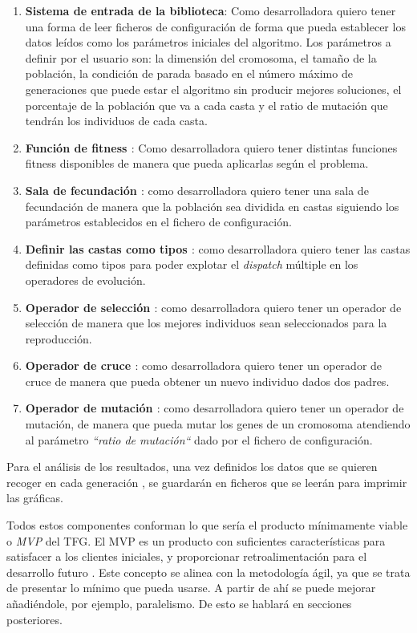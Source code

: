 \begin{enumerate}
    \item \textbf{Sistema de entrada de la biblioteca}: Como desarrolladora quiero tener una forma de leer ficheros de configuración de forma que pueda
    establecer los datos leídos como los parámetros iniciales del algoritmo. Los parámetros a definir por el usuario son: la dimensión del cromosoma, el tamaño de la población, 
    la condición de parada basado en el número máximo de generaciones que puede estar el algoritmo sin producir mejores soluciones, el porcentaje de la población que va a cada casta y 
    el ratio de mutación que tendrán los individuos de cada casta.
    \item \textbf{Función de fitness \cite{project_repository_8}}: Como desarrolladora quiero tener distintas funciones fitness disponibles de manera que pueda aplicarlas según 
    el problema.
    \item \textbf{Sala de fecundación \cite{project_repository_17}}: como desarrolladora quiero tener una sala de fecundación de manera que la población sea dividida en castas siguiendo los parámetros establecidos
    en el fichero de configuración.
    \item \textbf{Definir las castas como tipos \cite{project_repository_21}}: como desarrolladora quiero tener las castas definidas como tipos para poder explotar el \emph{dispatch} múltiple en los operadores de evolución.
    \item \textbf{Operador de selección \cite{project_repository_18}}: como desarrolladora quiero tener un operador de selección de manera que los mejores individuos sean seleccionados para la reproducción.
    \item \textbf{Operador de cruce \cite{project_repository_19}}: como desarrolladora quiero tener un operador de cruce de manera que pueda obtener un nuevo individuo dados dos padres.
    \item \textbf{Operador de mutación \cite{project_repository_20}}: como desarrolladora quiero tener un operador de mutación, de manera que pueda mutar los genes de un cromosoma atendiendo al parámetro
    \emph{``ratio de mutación``} dado por el fichero de configuración. 
\end{enumerate}

Para el análisis de los resultados, una vez definidos los datos que se quieren recoger en cada generación \cite{pull_17}, 
se guardarán en ficheros que se leerán para imprimir las gráficas.

Todos estos componentes conforman lo que sería el producto mínimamente viable o \emph{MVP} del TFG. El MVP es un producto
con suficientes características para satisfacer a los clientes iniciales, y proporcionar retroalimentación para el desarrollo futuro \cite{mvp}. 
Este concepto se alinea con la metodología ágil, ya que se trata de presentar lo mínimo que pueda usarse. A partir de ahí se puede mejorar 
añadiéndole, por ejemplo, paralelismo. De esto se hablará en secciones posteriores.
